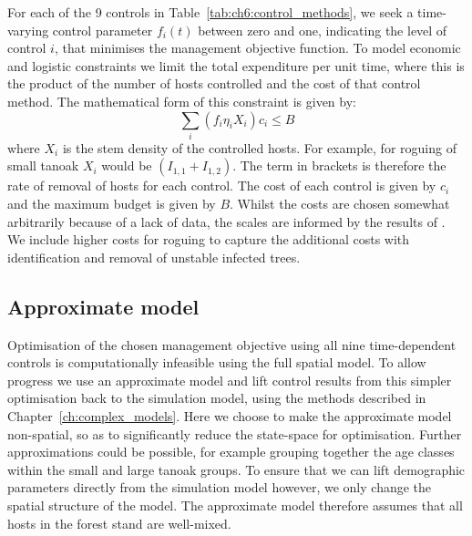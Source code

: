 For each of the 9 controls in Table~\ref{tab:ch6:control_methods}, we seek a time-varying control parameter $f_i(t)$ between zero and one, indicating the level of control $i$, that minimises the management objective function. To model economic and logistic constraints we limit the total expenditure per unit time, where this is the product of the number of hosts controlled and the cost of that control method. The mathematical form of this constraint is given by:
\begin{equation}
    \sum_i \left(f_i\eta_iX_i\right)c_i \leq B
\end{equation}
where $X_i$ is the stem density of the controlled hosts. For example, for roguing of small tanoak $X_i$ would be $\left(I_{1,1} + I_{1,2}\right)$. The term in brackets is therefore the rate of removal of hosts for each control. The cost of each control is given by $c_i$ and the maximum budget is given by $B$. Whilst the costs are chosen somewhat arbitrarily because of a lack of data, the scales are informed by the results of \citet{kovacs_predicting_2011}. We include higher costs for roguing to capture the additional costs with identification and removal of unstable infected trees.

\subsection{Approximate model}

Optimisation of the chosen management objective using all nine time-dependent controls is computationally infeasible using the full spatial model. To allow progress we use an approximate model and lift control results from this simpler optimisation back to the simulation model, using the methods described in Chapter~\ref{ch:complex_models}. Here we choose to make the approximate model non-spatial, so as to significantly reduce the state-space for optimisation. Further approximations could be possible, for example grouping together the age classes within the small and large tanoak groups. To ensure that we can lift demographic parameters directly from the simulation model however, we only change the spatial structure of the model. The approximate model therefore assumes that all hosts in the forest stand are well-mixed.

